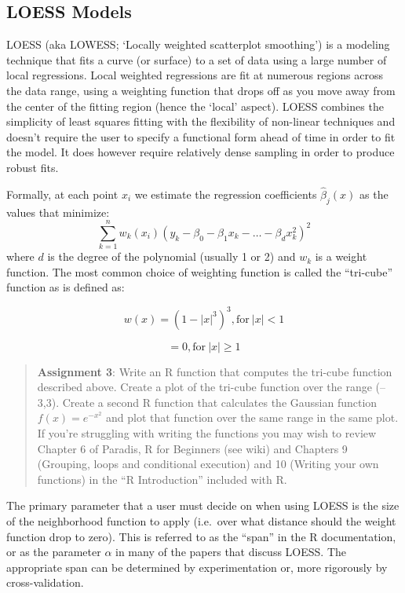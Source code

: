 \documentclass{article}
\newcommand{\lt}{\ensuremath{<}}
\begin{document}
\subsection{LOESS Models}

LOESS (aka LOWESS; `Locally weighted scatterplot smoothing') is a
modeling technique that fits a curve (or surface) to a set of data using
a large number of local regressions. Local weighted regressions are fit
at numerous regions across the data range, using a weighting function
that drops off as you move away from the center of the fitting region
(hence the `local' aspect). LOESS combines the simplicity of least
squares fitting with the flexibility of non-linear techniques and
doesn't require the user to specify a functional form ahead of time in
order to fit the model. It does however require relatively dense
sampling in order to produce robust fits.

Formally, at each point $x_i$ we estimate the regression coefficients
$\hat{\beta}_j(x)$ as the values that minimize:
\[\sum_{k=1}^n w_k(x_i)(y_k - \beta_0 - \beta_1 x_k - \ldots - \beta_d x_k^2)^2\]
where $d$ is the degree of the polynomial (usually 1 or 2) and $w_k$ is
a weight function. The most common choice of weighting function is
called the ``tri-cube'' function as is defined as:

\[w(x) = (1-|x|^3)^3, \mbox{for}\ |x| \lt 1\]

\[= 0, \mbox{for}\ |x| \geq 1\]

\begin{quote}
\textbf{Assignment 3}: Write an R function that computes the tri-cube
function described above. Create a plot of the tri-cube function over
the range (--3,3). Create a second R function that calculates the
Gaussian function $f(x) = e^{-x^2}$ and plot that function over the same
range in the same plot. If you're struggling with writing the functions
you may wish to review Chapter 6 of Paradis, R for Beginners (see wiki)
and Chapters 9 (Grouping, loops and conditional execution) and 10
(Writing your own functions) in the ``R Introduction'' included with R.

\end{quote}
The primary parameter that a user must decide on when using LOESS is the
size of the neighborhood function to apply (i.e.~over what distance
should the weight function drop to zero). This is referred to as the
``span'' in the R documentation, or as the parameter $\alpha$ in many of
the papers that discuss LOESS. The appropriate span can be determined by
experimentation or, more rigorously by cross-validation.
\end{document}
